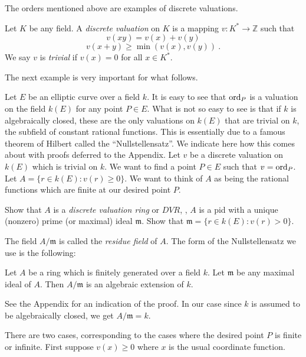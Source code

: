 The orders mentioned above are examples of discrete valuations.

\begin{defi}
\label{d2.8.16}
Let $K$ be any field. A {\it discrete valuation} on $K$ is a mapping $v:K^{*}\rightarrow \mathbb{Z}$ such that
$$
v(xy)=v(x)+v(y)
$$
$$
v(x+y)\geq\min(v(x),v(y))\ .
$$
We say $v$ is {\it trivial} if $v(x)=0$ for all $x\in K^{*}$.
\end{defi}
The next example is very important for what follows.

\begin{example}
\label{e2.8.1}
Let $E$ be an elliptic curve over a field $k$. It is easy to see that $\operatorname{ord}_{P}$ is a valuation on the field $k(E)$ for any point $P\in E$. What is not so easy to see is that if $k$ is algebraically closed, these are the only valuations on $k(E)$ that are trivial on $k$, the subfield of constant rational functions. This is essentially due to a famous theorem of Hilbert called the ``Nullstellensatz''. We indicate here how this comes about with proofs deferred to the Appendix. Let $v$ be a discrete valuation on $k(E)$ which is trivial on $k$. We want to find a point $P\in E$ such that $v=\operatorname{ord}_{P}$. Let $A=\{r\in k(E):v(r)\geq 0\}$. We want to think of $A$ as being the rational functions which are finite at our desired point $P$.
\end{example}

\begin{exo}
\label{e2.8.11}
Show that $A$ is a {\it discrete valuation ring} or $DVR$, \ie, $A$ is a pid with a unique (nonzero) prime (or maximal) ideal $\mathfrak{m}$. Show that $\mathfrak{m}=\{r\in k(E):v(r)>0\}$.
\end{exo}
The field $A/\mathfrak{m}$ is called the {\it residue field} of $A$. The form of the Nullstellensatz we use is the following:

\begin{theo}
\label{t2.8.11}
Let $A$ be a ring which is finitely generated over a field $k$. Let $\mathfrak{m}$ be any maximal ideal of $A$. Then $A/\mathfrak{m}$ is an algebraic extension of $k$.
\end{theo}
See the Appendix for an indication of the proof. In our case since $k$ is assumed to be algebraically closed, we get $A/\mathfrak{m}=k$.

There are two cases, corresponding to the cases where the desired point $P$ is finite or infinite. First suppose $v(x)\geq 0$ where $x$ is the usual coordinate function.

